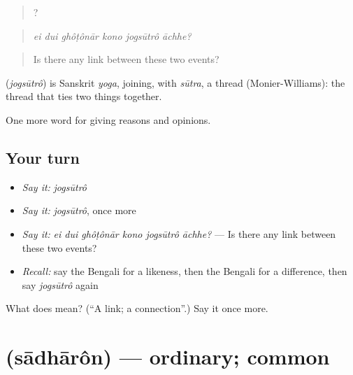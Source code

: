 \begin{quote}
     ?
\end{quote}

\begin{quote}
\emph{ei dui ghôṭônār kono jogsūtrô āchhe?}
\end{quote}

\begin{quote}
Is there any link between these two events?
\end{quote}

\begin{cousinweb}
\textbf{} (\emph{jogsūtrô}) is Sanskrit \emph{yoga}, joining, with \emph{sūtra}, a thread (Monier-Williams): the thread that ties two things together.
\end{cousinweb}

\begin{grammarlens}[title={What you've built}]
One more word for giving reasons and opinions.
\end{grammarlens}

\subsection*{Your turn}
\begin{itemize}
\raggedright
  \item \emph{Say it:} \emph{jogsūtrô}
  \item \emph{Say it:} \emph{jogsūtrô}, once more
  \item \emph{Say it:} \emph{ei dui ghôṭônār kono jogsūtrô āchhe?} — Is there any link between these two events?
  \item \emph{Recall:} say the Bengali for a likeness, then the Bengali for a difference, then say \emph{jogsūtrô} again
\end{itemize}

\begin{tcolorbox}[breakable,colback=teal!4,colframe=teal!35!black,title={Before you move on}]
What does  mean? (\textquotedblleft{}A link; a connection\textquotedblright{}.) Say it once more.
\end{tcolorbox}
\section[\texorpdfstring{\bn{সাধারণ} (sādhārôn)}{সাধারণ (sādhārôn)}]{ (sādhārôn) — ordinary; common}

\label{lesson:BN-C358-sadharon}



